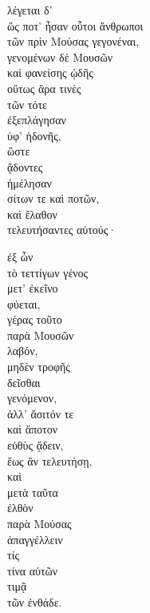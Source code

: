 {\large
\begin{greek}
\noindent λέγεται δ' \\
\tabto{2em} ὥς ποτ' ἦσαν οὗτοι ἄνθρωποι \\
\tabto{4em} τῶν πρὶν Μούσας γεγονέναι, \\
\tabto{2em} γενομένων δὲ Μουσῶν \\
\tabto{2em} καὶ φανείσης ᾠδῆς \\
\tabto{4em} οὕτως ἄρα τινὲς \\
\tabto{6em} τῶν τότε \\
\tabto{4em} ἐξεπλάγησαν \\
\tabto{6em} ὑφ' ἡδονῆς, \\
\tabto{4em} ὥστε \\
\tabto{4em} ᾄδοντες \\
\tabto{4em} ἠμέλησαν \\
\tabto{6em} σίτων τε καὶ ποτῶν, \\
\tabto{4em} καὶ ἔλαθον \\
\tabto{6em} τελευτήσαντες αὑτούς·

\tabto{6em} ἐξ ὧν \\
\tabto{6em} τὸ τεττίγων γένος \\
\tabto{8em} μετ' ἐκεῖνο \\
\tabto{6em} φύεται, \\
\tabto{6em} γέρας τοῦτο \\
\tabto{8em} παρὰ Μουσῶν \\
\tabto{6em} λαβόν, \\
\tabto{8em} μηδὲν τροφῆς \\
\tabto{6em} δεῖσθαι \\
\tabto{6em} γενόμενον, \\
\tabto{6em} ἀλλ' ἄσιτόν τε \\
\tabto{6em} καὶ ἄποτον \\
\tabto{6em} εὐθὺς ᾄδειν, \\
\tabto{8em} ἕως ἂν τελευτήσῃ, \\
\tabto{6em} καὶ \\
\tabto{8em} μετὰ ταῦτα \\
\tabto{6em} ἐλθὸν \\
\tabto{8em} παρὰ Μούσας \\
\tabto{8em} ἀπαγγέλλειν \\
\tabto{10em} τίς \\
\tabto{10em} τίνα αὐτῶν \\
\tabto{10em} τιμᾷ \\
\tabto{12em} τῶν ἐνθάδε. \\

\end{greek}
}

